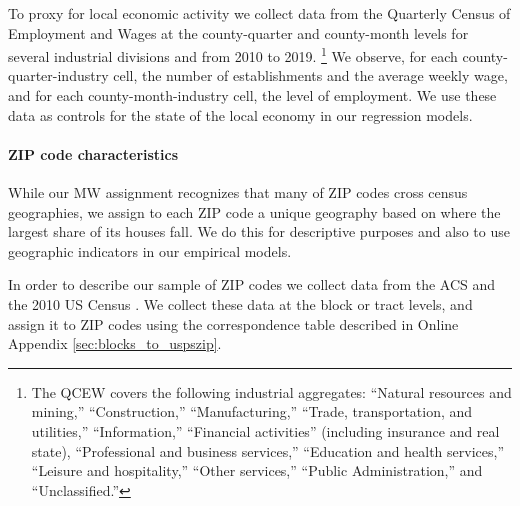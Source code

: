 To proxy for local economic activity we collect data from the 
Quarterly Census of Employment and Wages \parencite[QCEW;][]{QCEW} 
at the county-quarter and county-month levels for several industrial divisions 
and from 2010 to 2019.%
\footnote{The QCEW covers the following industrial aggregates: 
	``Natural resources and mining,'' ``Construction,'' ``Manufacturing,'' 
	``Trade, transportation, and utilities,'' ``Information,'' 
	``Financial activities'' (including insurance and real state), 
	``Professional and business services,'' ``Education and health services,'' 
	``Leisure and hospitality,'' ``Other services,'' ``Public Administration,''
	and ``Unclassified.''}
We observe, for each county-quarter-industry cell, the number of establishments 
and the average weekly wage, and 
for each county-month-industry cell, the level of employment.
We use these data as controls for the state of the local economy in our 
regression models.

%
%

\paragraph{ZIP code characteristics}

While our MW assignment recognizes that many of ZIP codes cross census 
geographies, we assign to each ZIP code a unique geography based on where the 
largest share of its houses fall.
We do this for descriptive purposes and also to use geographic indicators  
in our empirical models.

In order to describe our sample of ZIP codes we collect data from the ACS 
\parencite{CensusACS} and the 2010 US Census \parencite{CensusDecennial}.
We collect these data at the block or tract levels, and assign it to ZIP codes
using the correspondence table described in Online Appendix 
\ref{sec:blocks_to_uspszip}.

